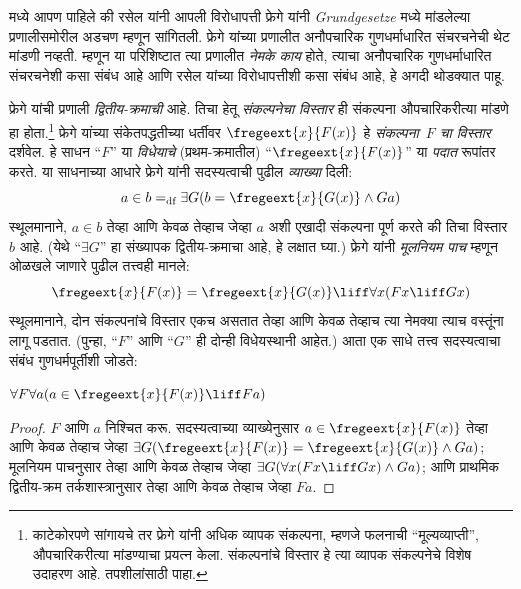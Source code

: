 \documentclass[../../../include/open-logic-section]{subfiles}
\begin{document}


 मध्ये आपण पाहिले की रसेल यांनी आपली विरोधापत्ती फ्रेगे यांनी \emph{Grundgesetze} मध्ये मांडलेल्या प्रणालीसमोरील अडचण म्हणून सांगितली. फ्रेगे यांच्या प्रणालीत अनौपचारिक गुणधर्माधारित संचरचनेची थेट मांडणी नव्हती. म्हणून या परिशिष्टात त्या प्रणालीत \emph{नेमके काय} होते, त्याचा अनौपचारिक गुणधर्माधारित संचरचनेशी कसा संबंध आहे आणि रसेल यांच्या विरोधापत्तीशी कसा संबंध आहे, हे अगदी थोडक्यात पाहू.

फ्रेगे यांची प्रणाली \emph{द्वितीय-क्रमाची} आहे. तिचा हेतू \emph{संकल्पनेचा विस्तार} ही संकल्पना औपचारिकरीत्या मांडणे हा होता.\footnote{काटेकोरपणे सांगायचे तर फ्रेगे यांनी अधिक व्यापक संकल्पना, म्हणजे फलनाची ``मूल्यव्याप्ती'', औपचारिकरीत्या मांडण्याचा प्रयत्न केला. संकल्पनांचे विस्तार हे त्या व्यापक संकल्पनेचे विशेष उदाहरण आहे. तपशीलांसाठी \citet[pp.\ 8--9]{Heck2012} पाहा.} फ्रेगे यांच्या संकेतपद्धतीच्या धर्तीवर $\fregeext{x}{F(x)}$ हे \emph{संकल्पना~$F$ चा विस्तार} दर्शवेल. हे साधन ``$F$'' या \emph{विधेयाचे} (प्रथम-क्रमातील) ``$\fregeext{x}{F(x)}$'' या \emph{पदात} रूपांतर करते. या साधनाच्या आधारे फ्रेगे यांनी सदस्यत्वाची पुढील \emph{व्याख्या} दिली:
\[
	a \in b =_\text{df} \exists G(b = \fregeext{x}{G(x)} \land Ga)
\]
स्थूलमानाने, $a \in b$ तेव्हा आणि केवळ तेव्हाच जेव्हा $a$ अशी एखादी संकल्पना पूर्ण करते की तिचा विस्तार $b$ आहे. (येथे ``$\exists G$'' हा संख्यापक द्वितीय-क्रमाचा आहे, हे लक्षात घ्या.) फ्रेगे यांनी \emph{मूलनियम पाच} म्हणून ओळखले जाणारे पुढील तत्त्वही मानले:
$$\fregeext{x}{F(x)} = \fregeext{x}{G(x)} \liff \forall x (Fx \liff Gx)$$
स्थूलमानाने, दोन संकल्पनांचे विस्तार एकच असतात तेव्हा आणि केवळ तेव्हाच त्या नेमक्या त्याच वस्तूंना लागू पडतात. (पुन्हा, ``$F$'' आणि ``$G$'' ही दोन्ही विधेयस्थानी आहेत.) आता एक साधे तत्त्व सदस्यत्वाचा संबंध गुणधर्मपूर्तीशी जोडते:

\begin{lem}
$\forall F \forall a(a \in \fregeext{x}{F(x)} \liff Fa)$
\end{lem}

\begin{proof}
$F$ आणि $a$ निश्चित करू. सदस्यत्वाच्या व्याख्येनुसार $a \in \fregeext{x}{F(x)}$ तेव्हा आणि केवळ तेव्हाच जेव्हा $\exists G(\fregeext{x}{F(x)}
= \fregeext{x}{G(x)} \land Ga)$; मूलनियम पाचनुसार तेव्हा आणि केवळ तेव्हाच जेव्हा $\exists G(\forall x(Fx \liff Gx) \land Ga)$; आणि प्राथमिक द्वितीय-क्रम तर्कशास्त्रानुसार तेव्हा आणि केवळ तेव्हाच जेव्हा $Fa$.
\end{proof}
\end{document}
